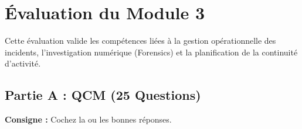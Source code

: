 \chapter{Évaluation du Module 3}
\label{chap:evalmod3}

Cette évaluation valide les compétences liées à la gestion opérationnelle des incidents, l'investigation numérique (Forensics) et la planification de la continuité d'activité.

\section{Partie A : QCM (25 Questions)}

\textbf{Consigne :} Cochez la ou les bonnes réponses.

